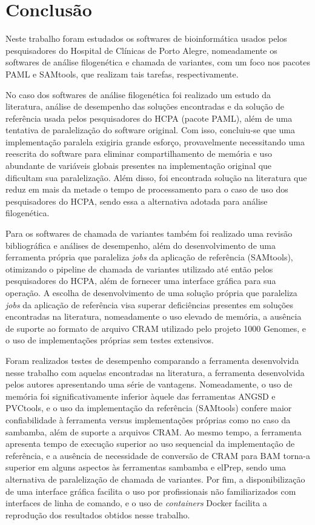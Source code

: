 \documentclass[cic,tc]{iiufrgs}
\begin{document}
{%
%
%
%
\chapter{Conclusão}
\label{chap:conc}

Neste trabalho foram estudados os softwares de bioinformática usados pelos
pesquisadores do Hospital de Clínicas de Porto Alegre, nomeadamente os
softwares de análise filogenética e chamada de variantes, com um foco nos
pacotes PAML e SAMtools, que realizam tais tarefas, respectivamente.

No caso dos softwares de análise filogenética foi realizado um estudo da
literatura, análise de desempenho das soluções encontradas e da solução de
referência usada pelos pesquisadores do HCPA (pacote PAML), além de uma
tentativa de paralelização do software original. Com isso, concluiu-se que uma
implementação paralela exigiria grande esforço, provavelmente necessitando uma
reescrita do software para eliminar compartilhamento de memória e uso
abundante de variáveis globais presentes na implementação original que
dificultam sua paralelização. Além disso, foi encontrada solução na literatura
que reduz em mais da metade o tempo de processamento para o caso de uso dos
pesquisadores do HCPA, sendo essa a alternativa adotada para análise
filogenética.

Para os softwares de chamada de variantes também foi realizado uma revisão
bibliográfica e análises de desempenho, além do desenvolvimento de uma
ferramenta própria que paraleliza \textit{jobs} da aplicação de referência
(SAMtools), otimizando o pipeline de chamada de variantes utilizado até então
pelos pesquisadores do HCPA, além de fornecer uma interface gráfica para sua
operação. A escolha de desenvolvimento de uma solução própria que paraleliza
\textit{jobs} da aplicação de referência visa superar deficiências presentes em
soluções encontradas na literatura, nomeadamente o uso elevado de memória, a
ausência de suporte ao formato de arquivo CRAM utilizado pelo projeto 1000
Genomes, e o uso de implementações próprias sem testes extensivos.

Foram realizados testes de desempenho comparando a ferramenta desenvolvida
nesse trabalho com aquelas encontradas na literatura, a ferramenta desenvolvida
pelos autores apresentando uma série de vantagens. Nomeadamente, o uso de
memória foi significativamente inferior àquele das ferramentas ANGSD e
PVCtools, e o uso da implementação da referência (SAMtools) confere maior
confiabilidade à ferramenta versus implementações próprias como no caso da
sambamba, além de suporte a arquivos CRAM. Ao mesmo tempo, a ferramenta
apresenta tempo de execução superior ao uso sequencial da implementação de
referência, e a ausência de necessidade de conversão de CRAM para BAM torna-a
superior em alguns aspectos às ferramentas sambamba e elPrep, sendo uma
alternativa de paralelização de chamada de variantes. Por fim, a
disponibilização de uma interface gráfica facilita o uso por profissionais não
familiarizados com interfaces de linha de comando, e o uso de \textit{containers} Docker
facilita a reprodução dos resultados obtidos nesse trabalho.

}
\end{document}
